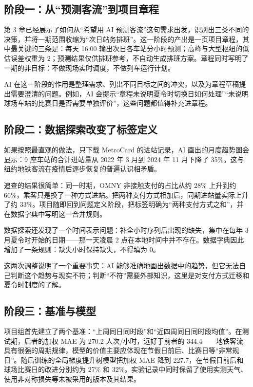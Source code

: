 \subsection*{阶段一：从“预测客流”到项目章程}

第 3 章已经展示了如何从“希望用 AI 预测客流”这句需求出发，识别出三类不同的决策，并将一期范围收缩为“次日站务排班”。这一阶段的产出是一页项目章程，其中最关键的三条是：每天 16:00 输出次日各车站分小时预测；高峰与大型枢纽的低估误差权重为 2；预测结果仅供排班参考，不自动生成排班方案。章程同时写明了一期的非目标：不做现场实时调度，不做列车运行计划。

AI 在这一阶段的作用是整理需求、列出不同目标之间的冲突，以及为章程草稿提出需要澄清的问题。例如，AI 会提示“章程未说明夏令时切换日如何处理”“未说明球场车站的比赛日是否需要单独评价”，这些问题都值得补充进章程。

\subsection*{阶段二：数据探索改变了标签定义}

如果按照最直观的做法，只下载 MetroCard 的进站记录，AI 画出的月度趋势图会显示：9 座车站的合计进站量从 2022 年 3 月到 2024 年 11 月下降了 35\%。这与纽约地铁客流在疫情后逐步恢复的普遍认识相矛盾。

追查的结果很简单：同一时期，OMNY 非接触支付的占比从约 28\% 上升到约 66\%，乘客只是换了一种方式进站。把两种支付方式相加后，同期进站量实际上升了约 33\%。项目随即回到问题定义阶段，把标签明确为“两种支付方式之和”，并在数据字典中写明这一合并规则。

数据探索还发现了一个时间表示问题：补全小时序列后出现的缺失，集中在每年 3 月夏令时开始的日期——那一天凌晨 2 点在本地时间中并不存在。数据字典因此增加了一条规则：缺失小时保持缺失，不得填为 0。

这两次调整说明了一个重要事实：AI 能够准确地画出数据中的趋势，但它无法自己判断这个趋势与现实不符；判断“不符”需要外部知识，这里是对支付方式迁移和夏令时制度的了解。

\subsection*{阶段三：基准与模型}

项目组首先建立了两个基准：“上周同日同时段”和“近四周同日同时段均值”。在测试期，后者的加权 MAE 为 270.2 人次/小时，远好于前者的 344.4——地铁客流具有很强的周期规律，模型的价值主要应体现在节假日前后、比赛日等“非常规日”。随后训练的全局梯度提升树模型把加权 MAE 降到 227.7，在节假日前后和球场比赛日的改进分别约为 27\% 和 32\%。实验记录中同时保留了使用实测天气、使用非对称损失等未被采用的版本及其结果。

